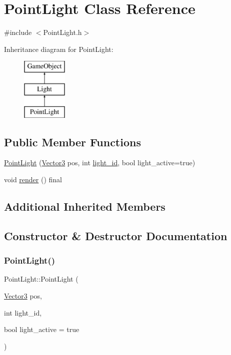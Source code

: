\hypertarget{class_point_light}{}\section{Point\+Light Class Reference}
\label{class_point_light}


{\ttfamily \#include $<$Point\+Light.\+h$>$}

Inheritance diagram for Point\+Light\+:\begin{figure}[H]
\begin{center}
\leavevmode
\includegraphics[height=3.000000cm]{class_point_light}
\end{center}
\end{figure}
\subsection*{Public Member Functions}
\begin{DoxyCompactItemize}
\item 
\hyperlink{class_point_light_af6171c3cdf01dca3c900e14fee5300fe}{Point\+Light} (\hyperlink{class_vector3}{Vector3} pos, int \hyperlink{class_light_ae0028340ad3a9f2e196b68365d5fe972}{light\+\_\+id}, bool light\+\_\+active=true)
\item 
void \hyperlink{class_point_light_a4584cb5e40e5dd6ab2f43ec84851152c}{render} () final
\end{DoxyCompactItemize}
\subsection*{Additional Inherited Members}


\subsection{Constructor \& Destructor Documentation}
\mbox{\label{class_point_light_af6171c3cdf01dca3c900e14fee5300fe}} 
\subsubsection{\texorpdfstring{Point\+Light()}{PointLight()}}
{\footnotesize\ttfamily Point\+Light\+::\+Point\+Light (\begin{DoxyParamCaption}\item[{\hyperlink{class_vector3}{Vector3}}]{pos,  }\item[{int}]{light\+\_\+id,  }\item[{bool}]{light\+\_\+active = {\ttfamily true} }\end{DoxyParamCaption})\hspace{0.3cm}{\ttfamily [inline]}}



